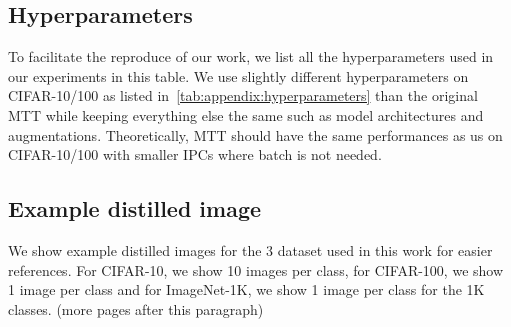 \documentclass[10pt,twocolumn,letterpaper]{article}
\begin{document}
\subsection{Hyperparameters}
\label{sec.appendix.hyperparameters}
To facilitate the reproduce of our work, we list all the hyperparameters used in our experiments in this table. We use slightly different hyperparameters on CIFAR-10/100  as listed in~\cref{tab:appendix:hyperparameters} than the original MTT while keeping everything else the same such as model architectures and augmentations. Theoretically, MTT should have the same performances as us on CIFAR-10/100 with smaller IPCs where batch is not needed.
\begin{table}[H]
\begin{center}
\end{center}
\caption{Hyperparameters used to get the distilled dataset.}
\label{tab:appendix:hyperparameters}
\end{table}

\subsection{Example distilled image}
We show example distilled images for the 3 dataset used in this work for easier references. For CIFAR-10, we show 10 images per class, for CIFAR-100, we show 1 image per class and for ImageNet-1K, we show 1 image per class for the 1K classes.
(more pages after this paragraph)
\end{document}
